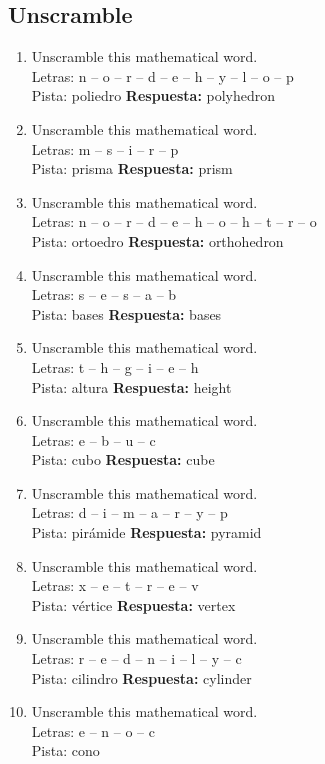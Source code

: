 \documentclass[11pt,a4paper]{article}
\begin{document}
\subsection{Unscramble}
\begin{enumerate}
\item Unscramble this mathematical word.\\Letras: n -- o -- r -- d -- e -- h -- y -- l -- o -- p\\Pista: poliedro
\textbf{Respuesta:} polyhedron
\item Unscramble this mathematical word.\\Letras: m -- s -- i -- r -- p\\Pista: prisma
\textbf{Respuesta:} prism
\item Unscramble this mathematical word.\\Letras: n -- o -- r -- d -- e -- h -- o -- h -- t -- r -- o\\Pista: ortoedro
\textbf{Respuesta:} orthohedron
\item Unscramble this mathematical word.\\Letras: s -- e -- s -- a -- b\\Pista: bases
\textbf{Respuesta:} bases
\item Unscramble this mathematical word.\\Letras: t -- h -- g -- i -- e -- h\\Pista: altura
\textbf{Respuesta:} height
\item Unscramble this mathematical word.\\Letras: e -- b -- u -- c\\Pista: cubo
\textbf{Respuesta:} cube
\item Unscramble this mathematical word.\\Letras: d -- i -- m -- a -- r -- y -- p\\Pista: pirámide
\textbf{Respuesta:} pyramid
\item Unscramble this mathematical word.\\Letras: x -- e -- t -- r -- e -- v\\Pista: vértice
\textbf{Respuesta:} vertex
\item Unscramble this mathematical word.\\Letras: r -- e -- d -- n -- i -- l -- y -- c\\Pista: cilindro
\textbf{Respuesta:} cylinder
\item Unscramble this mathematical word.\\Letras: e -- n -- o -- c\\Pista: cono

\end{enumerate}
\end{document}
